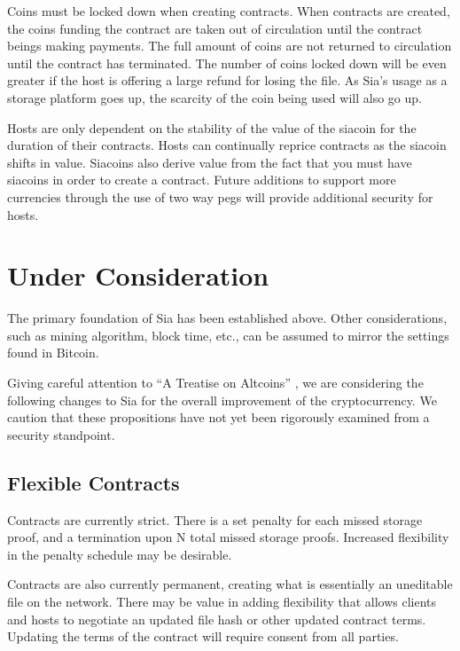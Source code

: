 \documentclass[twocolumn]{article}
\begin{document}
Coins must be locked down when creating contracts.
When contracts are created, the coins funding the contract are taken out of circulation until the contract beings making payments.
The full amount of coins are not returned to circulation until the contract has terminated.
The number of coins locked down will be even greater if the host is offering a large refund for losing the file.
As Sia's usage as a storage platform goes up, the scarcity of the coin being used will also go up.

Hosts are only dependent on the stability of the value of the siacoin for the duration of their contracts.
Hosts can continually reprice contracts as the siacoin shifts in value.
Siacoins also derive value from the fact that you must have siacoins in order to create a contract.
Future additions to support more currencies through the use of two way pegs will provide additional security for hosts.

\section{Under Consideration}
The primary foundation of Sia has been established above.
Other considerations, such as mining algorithm, block time, etc., can be assumed to mirror the settings found in Bitcoin.

Giving careful attention to ``A Treatise on Altcoins'' \cite{alts}, we are considering the following changes to Sia for the overall improvement of the cryptocurrency.
We caution that these propositions have not yet been rigorously examined from a security standpoint.

\subsection{Flexible Contracts}
Contracts are currently strict.
There is a set penalty for each missed storage proof, and a termination upon N total missed storage proofs.
Increased flexibility in the penalty schedule may be desirable.

Contracts are also currently permanent, creating what is essentially an uneditable file on the network.
There may be value in adding flexibility that allows clients and hosts to negotiate an updated file hash or other updated contract terms.
Updating the terms of the contract will require consent from all parties.

\end{document}
